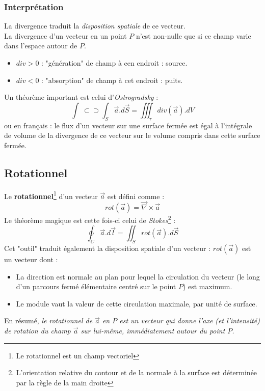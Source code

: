 \documentclass	[11pt, a4paper, openany]{book}
\newcommand{\oiint}{\int\!\!\!\!\!\!\! \:\!\subset\!\!\supset\!\!\!\!\!\!\!\int}
\begin{document}
		\subsubsection{Interprétation}
		La divergence traduit la \textit{disposition spatiale} de ce vecteur.\\
		La divergence d'un vecteur en un point $P$ n'est non-nulle que si ce champ varie dans l'espace autour de $P$.
		\begin{itemize}
			\item $div > 0$ : "génération" de champ à cen endroit : source.
			\item $div < 0$ : "absorption" de champ à cet endroit : puits.
		\end{itemize}
		Un théorème important est celui d'\textit{Ostrogradsky} :
		\begin{equation}
			\oiint_S \vec{a}.d\vec{S} = \iiint_\tau div(\vec{a}).dV
		\end{equation}
		ou en français : le flux d'un vecteur sur une surface fermée est égal à l'intégrale de volume de la divergence de ce vecteur sur le volume compris dans cette surface fermée.
		
		\subsection{Rotationnel}
		Le \textbf{rotationnel}\footnote{Le rotationnel est un champ vectoriel} d'un vecteur $\vec{a}$ est défini comme :
		\begin{equation}
			rot(\vec{a}) = \vec{\nabla} \times \vec{a}
		\end{equation}
		Le théorème magique est cette fois-ci celui de \textit{Stokes}\footnote{L'orientation relative du contour et de la normale à la surface est déterminée par la règle de la main droite} : 
		\begin{equation}
			\oint_C \vec{a}.d\vec{l} = \iint_S rot(\vec{a}).d\vec{S}
		\end{equation}
		Cet "outil" traduit également la disposition spatiale d'un vecteur : $rot(\vec{a})$ est un vecteur dont :
		\begin{itemize}
			\item La direction est normale au plan pour lequel la circulation du vecteur (le long d'un parcours fermé élémentaire centré sur le point $P$) est maximum.
			\item Le module vaut la valeur de cette circulation maximale, par unité de surface.
		\end{itemize}
		En résumé, \textit{le rotationnel de $\vec{a}$ en $P$ est un vecteur qui donne l'axe (et l'intensité) de rotation du champ $\vec{a}$ sur lui-même, immédiatement autour du point $P$.}
		
\end{document}

